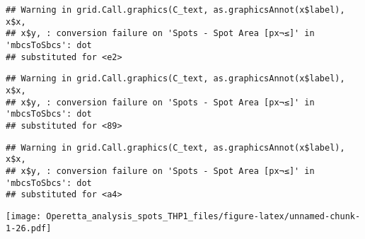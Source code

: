 \documentclass[
]{article}
\begin{document}
\begin{verbatim}
## Warning in grid.Call.graphics(C_text, as.graphicsAnnot(x$label), x$x,
## x$y, : conversion failure on 'Spots - Spot Area [px¬≤]' in 'mbcsToSbcs': dot
## substituted for <e2>
\end{verbatim}

\begin{verbatim}
## Warning in grid.Call.graphics(C_text, as.graphicsAnnot(x$label), x$x,
## x$y, : conversion failure on 'Spots - Spot Area [px¬≤]' in 'mbcsToSbcs': dot
## substituted for <89>
\end{verbatim}

\begin{verbatim}
## Warning in grid.Call.graphics(C_text, as.graphicsAnnot(x$label), x$x,
## x$y, : conversion failure on 'Spots - Spot Area [px¬≤]' in 'mbcsToSbcs': dot
## substituted for <a4>
\end{verbatim}

\texttt{[image: Operetta\_analysis\_spots\_THP1\_files/figure-latex/unnamed-chunk-1-26.pdf]}
\end{document}
